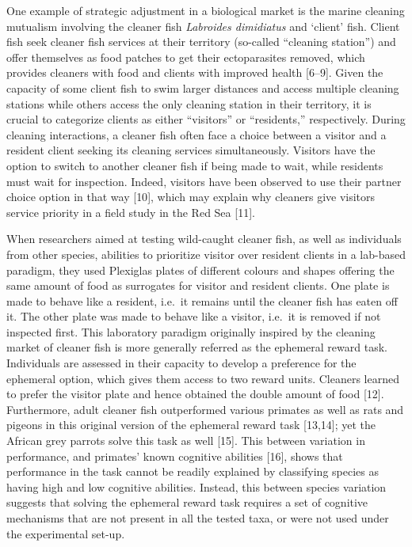 \documentclass[10pt,letterpaper]{article}
\begin{document}
One example of strategic adjustment in a biological market is the marine
cleaning mutualism involving the cleaner fish \emph{Labroides
dimidiatus} and `client' fish. Client fish seek cleaner fish services at
their territory (so-called ``cleaning station'') and offer themselves as
food patches to get their ectoparasites removed, which provides cleaners
with food and clients with improved health {[}6--9{]}. Given the
capacity of some client fish to swim larger distances and access
multiple cleaning stations while others access the only cleaning station
in their territory, it is crucial to categorize clients as either
``visitors'' or ``residents,'' respectively. During cleaning
interactions, a cleaner fish often face a choice between a visitor and a
resident client seeking its cleaning services simultaneously. Visitors
have the option to switch to another cleaner fish if being made to wait,
while residents must wait for inspection. Indeed, visitors have been
observed to use their partner choice option in that way {[}10{]}, which
may explain why cleaners give visitors service priority in a field study
in the Red Sea {[}11{]}.

When researchers aimed at testing wild-caught cleaner fish, as well as
individuals from other species, abilities to prioritize visitor over
resident clients in a lab-based paradigm, they used Plexiglas plates of
different colours and shapes offering the same amount of food as
surrogates for visitor and resident clients. One plate is made to behave
like a resident, i.e.~it remains until the cleaner fish has eaten off
it. The other plate was made to behave like a visitor, i.e.~it is
removed if not inspected first. This laboratory paradigm originally
inspired by the cleaning market of cleaner fish is more generally
referred as the ephemeral reward task. Individuals are assessed in their
capacity to develop a preference for the ephemeral option, which gives
them access to two reward units. Cleaners learned to prefer the visitor
plate and hence obtained the double amount of food {[}12{]}.
Furthermore, adult cleaner fish outperformed various primates as well as
rats and pigeons in this original version of the ephemeral reward task
{[}13,14{]}; yet the African grey parrots solve this task as well
{[}15{]}. This between variation in performance, and primates' known
cognitive abilities {[}16{]}, shows that performance in the task cannot
be readily explained by classifying species as having high and low
cognitive abilities. Instead, this between species variation suggests
that solving the ephemeral reward task requires a set of cognitive
mechanisms that are not present in all the tested taxa, or were not used
under the experimental set-up.
\end{document}
